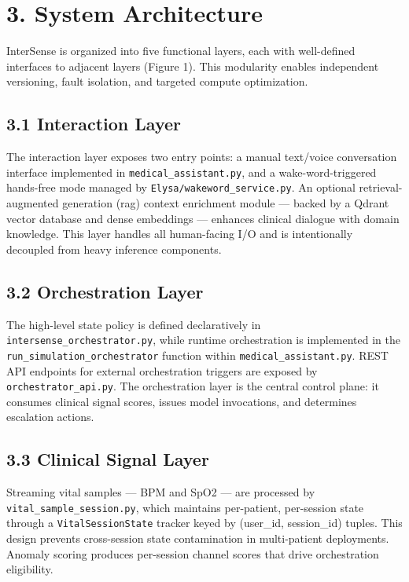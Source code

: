\documentclass[11pt,a4paper]{article}
\begin{document}
\section{3. System Architecture}
InterSense is organized into five functional layers, each with well-defined interfaces to adjacent layers (Figure 1). This modularity enables independent versioning, fault isolation, and targeted compute optimization.

\subsection{3.1 Interaction Layer}
The interaction layer exposes two entry points: a manual text/voice conversation interface implemented in \texttt{medical\_assistant.py}, and a wake-word-triggered hands-free mode managed by \texttt{Elysa/wakeword\_service.py}. An optional retrieval-augmented generation (\gls{rag}) context enrichment module — backed by a Qdrant vector database and dense embeddings — enhances clinical dialogue with domain knowledge. This layer handles all human-facing I/O and is intentionally decoupled from heavy inference components.

\subsection{3.2 Orchestration Layer}
The high-level state policy is defined declaratively in \texttt{intersense\_orchestrator.py}, while runtime orchestration is implemented in the \texttt{run\_simulation\_orchestrator} function within \texttt{medical\_assistant.py}. REST API endpoints for external orchestration triggers are exposed by \texttt{orchestrator\_api.py}. The orchestration layer is the central control plane: it consumes clinical signal scores, issues model invocations, and determines escalation actions.

\subsection{3.3 Clinical Signal Layer}
Streaming vital samples — BPM and SpO2 — are processed by \texttt{vital\_sample\_session.py}, which maintains per-patient, per-session state through a \texttt{VitalSessionState} tracker keyed by (user\_id, session\_id) tuples. This design prevents cross-session state contamination in multi-patient deployments. Anomaly scoring produces per-session channel scores that drive orchestration eligibility.
\end{document}
